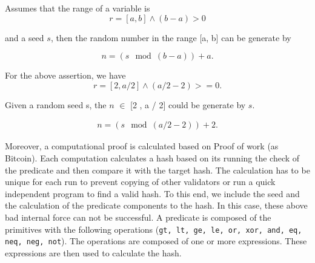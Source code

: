 \documentclass[runningheads]{llncs}
\begin{document}
Assumes that the range of a variable is 
\begin{displaymath}
r = [a, b] \land (b-a) > 0
\end{displaymath}

\noindent and a seed $s$, then the random number in the range [a, b] can be generate by 

\begin{displaymath}
n = (s\mod(b - a)) + a.
\end{displaymath}


\noindent For the above assertion, we have  
\begin{displaymath}
r = [2 , a / 2] \land (a / 2 - 2) >= 0. 
\end{displaymath}

\noindent Given a random seed s, the $n$ $\in$ [2 , a / 2] could be generate by $s$.

\begin{gather}
n = (s\mod (a / 2 - 2)) + 2.
\end{gather}

Moreover, a computational proof is calculated based on Proof of work (as Bitcoin). Each computation calculates a hash based on its running the check of the predicate and then compare it with the target hash. The calculation has to be unique for each run to prevent copying of other validators or run a quick independent program to find a valid hash. To this end, we include the seed and the calculation of the predicate components to the hash. In this case, these above bad internal force can not be successful. A predicate is composed of the primitives with the following operations (\texttt{gt, lt, ge, le, or, xor, and, eq, neq, neg, not}). The operations are composed of one or more expressions. These expressions are then used to calculate the hash.
\end{document}
